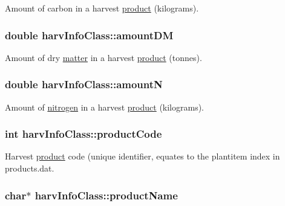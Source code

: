 Amount of carbon in a harvest \hyperlink{classproduct}{product} (kilograms). \hypertarget{classharv_info_class_a1a3fe7dfd0860cdc91f818c4db6aa766}{
\subsubsection[{amountDM}]{\setlength{\rightskip}{0pt plus 5cm}double {\bf harvInfoClass::amountDM}}}
\label{classharv_info_class_a1a3fe7dfd0860cdc91f818c4db6aa766}


Amount of dry \hyperlink{classmatter}{matter} in a harvest \hyperlink{classproduct}{product} (tonnes). \hypertarget{classharv_info_class_ae6e91edc30bd199357f99f0c19bd7eb8}{
\subsubsection[{amountN}]{\setlength{\rightskip}{0pt plus 5cm}double {\bf harvInfoClass::amountN}}}
\label{classharv_info_class_ae6e91edc30bd199357f99f0c19bd7eb8}


Amount of \hyperlink{classnitrogen}{nitrogen} in a harvest \hyperlink{classproduct}{product} (kilograms). \hypertarget{classharv_info_class_a6018eec14905b0fc5a02ce1187f39ecc}{
\subsubsection[{productCode}]{\setlength{\rightskip}{0pt plus 5cm}int {\bf harvInfoClass::productCode}}}
\label{classharv_info_class_a6018eec14905b0fc5a02ce1187f39ecc}


Harvest \hyperlink{classproduct}{product} code (unique identifier, equates to the plantitem index in products.dat. \hypertarget{classharv_info_class_a174c8d172bdcd9b289bfa7471fef0fa3}{
\subsubsection[{productName}]{\setlength{\rightskip}{0pt plus 5cm}char$\ast$ {\bf harvInfoClass::productName}}}
\label{classharv_info_class_a174c8d172bdcd9b289bfa7471fef0fa3}


